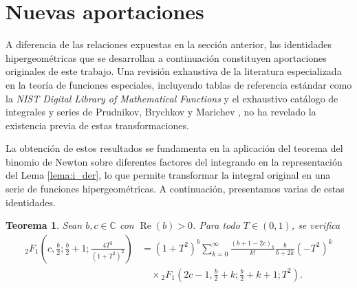 \documentclass[12pt,a4paper]{book}
\newtheorem{theorem}{Teorema}
\begin{document}
\section{Nuevas aportaciones}

A diferencia de las relaciones expuestas en la sección anterior, las identidades hipergeométricas que se desarrollan a continuación constituyen aportaciones originales de este trabajo. Una revisión exhaustiva de la literatura especializada en la teoría de funciones especiales, incluyendo tablas de referencia estándar como la \textit{NIST Digital Library of Mathematical Functions} \cite{dlmf} y el exhaustivo catálogo de integrales y series de Prudnikov, Brychkov y Marichev \cite{prudnikov1990integrals}, no ha revelado la existencia previa de estas transformaciones.

La obtención de estos resultados se fundamenta en la aplicación del teorema del binomio de Newton sobre diferentes factores del integrando en la representación del Lema \ref{lema:i_der}, lo que permite transformar la integral original en una serie de funciones hipergeométricas. A continuación, presentamos varias de estas identidades.

\begin{theorem}
\label{thm:nueva_identidad_1}
Sean $b, c \in \mathbb{C}$ con $\operatorname{Re}(b) > 0$. Para todo $T \in (0, 1)$, se verifica
\begin{align*}
    {}_{2}F_{1}\left(c, \frac{b}{2}; \frac{b}{2}+1; \frac{4T^2}{(1+T^2)^2}\right) &= (1+T^2)^b \sum_{k=0}^{\infty} \frac{ (b+1-2c)_k }{k!}\frac{b}{b+2k}  (-T^2)^k \\
    &\quad \times {}_{2}F_{1}\left(2c-1, \frac{b}{2}+k; \frac{b}{2}+k+1; T^2\right).
\end{align*}
\end{theorem}
\end{document}
